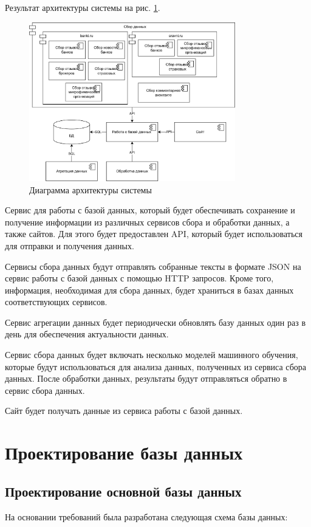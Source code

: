 \documentclass[PI, VKR]{HSEUniversity}
\begin{document}
Результат архитектуры системы на рис. \ref{fig:architecture}.

\begin{figure}[h!]
\centering
\includegraphics[width=0.8\textwidth]{img/architecture.png}
\caption{\label{fig:architecture}Диаграмма архитектуры системы}
\end{figure}

Сервис для работы с базой данных, который будет обеспечивать сохранение и получение информации из различных сервисов сбора и обработки данных, а также сайтов. Для этого будет предоставлен API, который будет использоваться для отправки и получения данных.

Сервисы сбора данных будут отправлять собранные тексты в формате JSON на сервис работы с базой данных с помощью HTTP запросов. Кроме того, информация, необходимая для сбора данных, будет храниться в базах данных соответствующих сервисов.

Сервис агрегации данных будет периодически обновлять базу данных один раз в день для обеспечения актуальности данных.

Сервис сбора данных будет включать несколько моделей машинного обучения, которые будут использоваться для анализа данных, полученных из сервиса сбора данных. После обработки данных, результаты будут отправляться обратно в сервис сбора данных.

Сайт будет получать данные из сервиса работы с базой данных.
\section{Проектирование базы данных}
\label{sec:orge356fb9}
\subsection{Проектирование основной базы данных}
\label{sec:org9adb55b}
На основании требований была разработана следующая схема базы данных:
\end{document}
